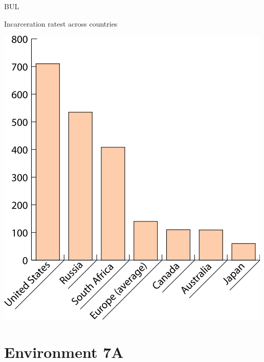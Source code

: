 \begin{chart}{B}{UL}
\caption{Incarceration ratest across countries}
\label{chart:incarceration}
\includegraphics[width=\chartwidth,height=\chartheight]{incarceration}  
\end{chart}

%
\section{Environment 7A}

\lipsum[1-4]

